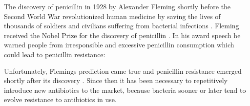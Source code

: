 The discovery of penicillin in 1928 by Alexander Fleming shortly before the Second World War revolutionized human medicine by saving the lives of thousands of soldiers and civilians suffering from bacterial infections \cite{cdc_biggest_2019}. Fleming received the Nobel Prize for the discovery of penicillin \cite{fleming}. In his award speech he warned people from irresponsible and excessive penicillin consumption which could lead to penicillin resistance:

 
 
Unfortunately, Flemings prediction came true and penicillin resistance emerged shortly after its discovery \cite{lobanovska_penicillins_2017}. Since then it has been necessary to repetitively introduce new antibiotics to the market, because bacteria sooner or later tend to evolve resistance to antibiotics in use. 

